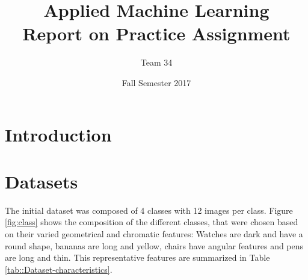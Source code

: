 \documentclass[a4paper,10pt]{article}
\title{Applied Machine Learning\\Report on Practice Assignment}
\author{Team 34}
\date{Fall Semester 2017}
\begin{document}
\maketitle

\section{Introduction}


\section{Datasets}

The initial dataset was composed of 4 classes with 12 images per class. Figure \ref{fig:class} shows the composition of the different classes, that were chosen based on their varied geometrical and chromatic features: Watches are dark and have a round shape, bananas are long and yellow, chairs have angular features and pens are long and thin. This representative features are summarized in Table \ref{tab::Dataset-characteristics}. 
\end{document}
